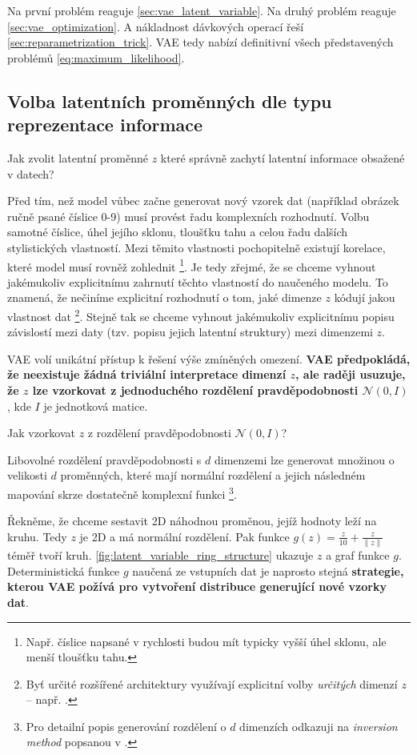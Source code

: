 Na první problém reaguje \autoref{sec:vae_latent_variable}.
Na druhý problém reaguje \autoref{sec:vae_optimization}. A nákladnost dávkových operací řeší \autoref{sec:reparametrization_trick}.
VAE tedy nabízí definitivní všech představených problémů \autoref{eq:maximum_likelihood}. 

\subsection{Volba latentních proměnných dle typu reprezentace informace}
\label{sec:vae_latent_variable}
Jak zvolit latentní proměnné $z$ které správně zachytí latentní informace obsažené v datech?

Před tím, než model vůbec začne generovat nový vzorek dat (například obrázek ručně psané číslice 0-9) musí provést řadu komplexních rozhodnutí.
Volbu samotné číslice, úhel jejího sklonu, tloušťku tahu a celou řadu dalších stylistických vlastností.
Mezi těmito vlastnosti pochopitelně existují korelace, které model musí rovněž zohlednit
\footnote{Např. číslice napsané v rychlosti budou mít typicky vyšší úhel sklonu, ale menší tloušťku tahu.}.
Je tedy zřejmé, že se chceme vyhnout jakémukoliv explicitnímu zahrnutí těchto vlastností do naučeného modelu.
To znamená, že nečiníme explicitní rozhodnutí o tom, jaké dimenze $z$ kódují jakou vlastnost dat
\footnote{Byť určité rozšířené architektury využívají explicitní volby \emph{určitých} dimenzí $z$ – např. \cite{Kulkarni2015}.}.
Stejně tak se chceme vyhnout jakémukoliv explicitnímu popisu závislostí mezi daty (tzv. popisu jejich latentní struktury) mezi dimenzemi $z$. \cite{Doersch2021}

VAE volí unikátní přístup k řešení výše zmíněných omezení. \textbf{VAE předpokládá, že neexistuje žádná triviální interpretace dimenzí $z$, ale raději usuzuje, že $z$ lze vzorkovat z jednoduchého rozdělení pravděpodobnosti $\mathcal{N}(0, I)$}, kde $I$ je jednotková matice. \cite{Doersch2021}

Jak vzorkovat $z$ z rozdělení pravděpodobnosti $\mathcal{N}(0, I)$?

Libovolné rozdělení pravděpodobnosti s $d$ dimenzemi lze generovat množinou o velikosti $d$ proměnných, které mají normální rozdělení a jejich následném mapování skrze dostatečně komplexní funkci
\footnote{Pro detailní popis generování rozdělení o $d$ dimenzích odkazuji na \emph{inversion method} popsanou v \cite{Devroye1986}.}.

Řekněme, že chceme sestavit 2D náhodnou proměnou, jejíž hodnoty leží na kruhu.
Tedy $z$ je 2D a má normální rozdělení. Pak funkce $g(z) = \frac{z}{10} + \frac{z}{\| z \|}$ téměř tvoří kruh.
\autoref{fig:latent_variable_ring_structure} ukazuje $z$ a graf funkce $g$.
Deterministická funkce $g$ naučená ze vstupních dat je naprosto stejná \textbf{strategie, kterou VAE požívá pro vytvoření distribuce generující nové vzorky dat}.  \cite{Doersch2021}


